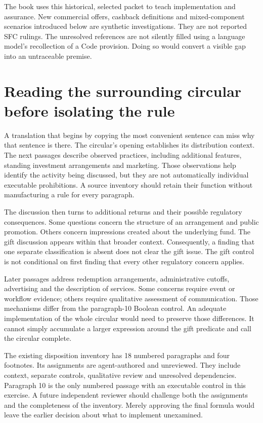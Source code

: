 The book uses this historical, selected packet to teach implementation and
assurance. New commercial offers, cashback definitions and mixed-component
scenarios introduced below are synthetic investigations. They are not reported
SFC rulings. The unresolved references are not silently filled using a language
model's recollection of a Code provision. Doing so would convert a visible gap
into an untraceable premise.

\section{Reading the surrounding circular before isolating the rule}
\label{merge:M02:01}

\label{sec:circular-context}
A translation that begins by copying the most convenient sentence can miss why
that sentence is there. The circular's opening establishes its distribution
context. The next passages describe observed practices, including additional
features, standing investment arrangements and marketing. Those observations
help identify the activity being discussed, but they are not automatically
individual executable prohibitions. A source inventory should retain their
function without manufacturing a rule for every paragraph.

The discussion then turns to additional returns and their possible regulatory
consequences. Some questions concern the structure of an arrangement and public
promotion. Others concern impressions created about the underlying fund. The
gift discussion appears within that broader context. Consequently, a finding
that one separate classification is absent does not clear the gift issue. The
gift control is not conditional on first finding that every other regulatory
concern applies.


Later passages address redemption arrangements, administrative cutoffs,
advertising and the description of services. Some concerns require event or
workflow evidence; others require qualitative assessment of communication.
Those mechanisms differ from the paragraph-10 Boolean control. An adequate
implementation of the whole circular would need to preserve those differences.
It cannot simply accumulate a larger expression around the gift predicate and
call the circular complete.

The existing disposition inventory has 18 numbered paragraphs and four
footnotes. Its assignments are agent-authored and unreviewed. They include
context, separate controls, qualitative review and unresolved dependencies.
Paragraph 10 is the only numbered passage with an executable control in this
exercise. A future independent reviewer should challenge both the assignments
and the completeness of the inventory. Merely approving the final formula would
leave the earlier decision about what to implement unexamined.

